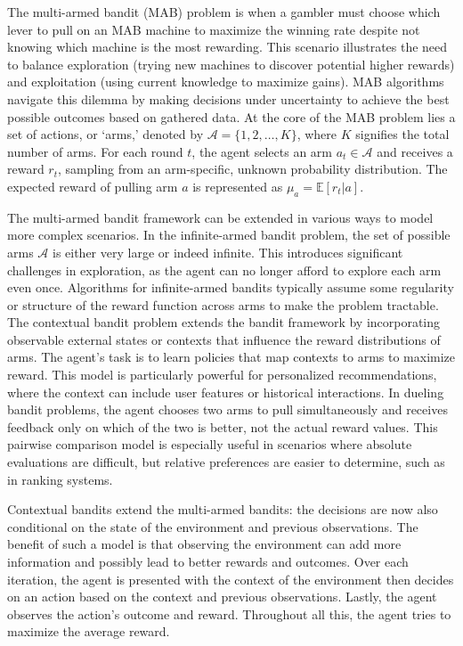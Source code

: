 \documentclass[
  letterpaper,
  numbers=noenddot,
  DIV=11,
  oneside]{scrreprt}
\theoremstyle{remark}
\begin{document}
The multi-armed bandit (MAB) problem is when a gambler must choose which
lever to pull on an MAB machine to maximize the winning rate despite not
knowing which machine is the most rewarding. This scenario illustrates
the need to balance exploration (trying new machines to discover
potential higher rewards) and exploitation (using current knowledge to
maximize gains). MAB algorithms navigate this dilemma by making
decisions under uncertainty to achieve the best possible outcomes based
on gathered data. At the core of the MAB problem lies a set of actions,
or `arms,' denoted by \(\mathcal{A} = \{1, 2, \ldots, K\}\), where \(K\)
signifies the total number of arms. For each round \(t\), the agent
selects an arm \(a_t \in \mathcal{A}\) and receives a reward \(r_t\),
sampling from an arm-specific, unknown probability distribution. The
expected reward of pulling arm \(a\) is represented as
\(\mu_a = \mathbb{E}[r_t | a]\).

The multi-armed bandit framework can be extended in various ways to
model more complex scenarios. In the infinite-armed bandit problem, the
set of possible arms \(\mathcal{A}\) is either very large or indeed
infinite. This introduces significant challenges in exploration, as the
agent can no longer afford to explore each arm even once. Algorithms for
infinite-armed bandits typically assume some regularity or structure of
the reward function across arms to make the problem tractable. The
contextual bandit problem extends the bandit framework by incorporating
observable external states or contexts that influence the reward
distributions of arms. The agent's task is to learn policies that map
contexts to arms to maximize reward. This model is particularly powerful
for personalized recommendations, where the context can include user
features or historical interactions. In dueling bandit problems, the
agent chooses two arms to pull simultaneously and receives feedback only
on which of the two is better, not the actual reward values. This
pairwise comparison model is especially useful in scenarios where
absolute evaluations are difficult, but relative preferences are easier
to determine, such as in ranking systems.

Contextual bandits extend the multi-armed bandits: the decisions are now
also conditional on the state of the environment and previous
observations. The benefit of such a model is that observing the
environment can add more information and possibly lead to better rewards
and outcomes. Over each iteration, the agent is presented with the
context of the environment then decides on an action based on the
context and previous observations. Lastly, the agent observes the
action's outcome and reward. Throughout all this, the agent tries to
maximize the average reward.
\end{document}
